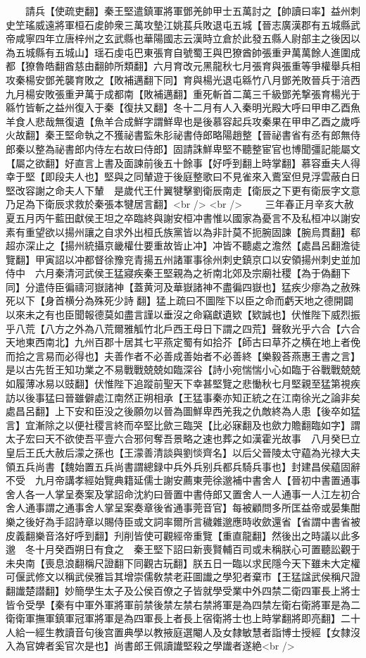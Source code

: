 　　請兵【使疏吏翻】秦王堅遣鎮軍將軍鄧羌帥甲士五萬討之【帥讀曰率】益州刺史笁瑤威遠將軍桓石䖍帥衆三萬攻墊江姚萇兵敗退屯五城【晉志廣漢郡有五城縣武帝咸寧四年立唐梓州之玄武縣也華陽國志云漢時立倉於此發五縣人尉部主之後因以為五城縣有五城山】瑶石虔屯巴東張育自號蜀王與巴獠酋帥張重尹萬萬餘人進圍成都【獠魯皓翻酋慈由翻帥所類翻】六月育改元黑龍秋七月張育與張重等爭權舉兵相攻秦楊安鄧羌襲育敗之【敗補邁翻下同】育與楊光退屯緜竹八月鄧羌敗晉兵于涪西九月楊安敗張重尹萬于成都南【敗補邁翻】重死斬首二萬三千級鄧羌撃張育楊光于緜竹皆斬之益州復入于秦【復扶又翻】冬十二月有人入秦明光殿大呼曰甲申乙酉魚羊食人悲哉無復遺【魚羊合成鮮字謂鮮卑也是後慕容起兵攻秦果在甲申乙酉之歲呼火故翻】秦王堅命執之不獲祕書監朱肜祕書侍郎略陽趙整【晉祕書省有丞有郎無侍郎秦以整為祕書郎内侍左右故曰侍郎】固請誅鮮卑堅不聽整宦官也博聞彊記能屬文【屬之欲翻】好直言上書及面諫前後五十餘事【好呼到翻上時掌翻】慕容垂夫人得幸于堅【即段夫人也】堅與之同輦遊于後庭整歌曰不見雀來入鷰室但見浮雲蔽白日堅改容謝之命夫人下輦　是歲代王什翼犍擊劉衛辰南走【衛辰之下更有衛辰字文意乃足為下衛辰求救於秦張本犍居言翻】<br />
<br />
　　三年春正月辛亥大赦　夏五月丙午藍田獻侯王坦之卒臨終與謝安桓冲書惟以國家為憂言不及私桓冲以謝安素有重望欲以揚州讓之自求外出桓氏族黨皆以為非計莫不扼腕固諫【腕烏貫翻】郗超亦深止之【揚州統攝京畿權仕要重故皆止冲】冲皆不聽處之澹然【處昌呂翻澹徒覽翻】甲寅詔以冲都督徐豫兖青揚五州諸軍事徐州刺史鎮京口以安領揚州刺史並加侍中　六月秦清河武侯王猛寢疾秦王堅親為之祈南北郊及宗廟社稷【為于偽翻下同】分遣侍臣徧禱河嶽諸神【蓋黄河及華嶽諸神不盡徧四嶽也】猛疾少瘳為之赦殊死以下【身首横分為殊死少詩翻】猛上疏曰不圖陛下以臣之命而虧天地之德開闢以來未之有也臣聞報德莫如盡言謹以垂沒之命竊獻遺欵【欵誠也】伏惟陛下威烈振乎八荒【八方之外為八荒爾雅觚竹北戶西王母日下謂之四荒】聲敎光乎六合【六合天地東西南北】九州百郡十居其七平燕定蜀有如拾芥【師古曰草芥之横在地上者俛而拾之言易而必得也】夫善作者不必善成善始者不必善終【樂毅荅燕惠王書之言】是以古先哲王知功業之不易戰戰兢兢如臨深谷【詩小宛惴惴小心如臨于谷戰戰兢兢如履薄冰易以豉翻】伏惟陛下追蹤前聖天下幸甚堅覽之悲慟秋七月堅親至猛第視疾訪以後事猛曰晉雖僻處江南然正朔相承【王猛事秦亦知正統之在江南徐光之論非矣處昌呂翻】上下安和臣没之後願勿以晉為圖鮮卑西羌我之仇敵終為人患【後卒如猛言】宜漸除之以便社稷言終而卒堅比歛三臨哭【比必寐翻及也歛力贍翻臨如字】謂太子宏曰天不欲使吾平壹六合邪何奪吾景略之速也葬之如漢霍光故事　八月癸巳立皇后王氏大赦后濛之孫也【王濛善清談與劉惔齊名】以后父晉陵太守藴為光禄大夫領五兵尚書【魏始置五兵尚書謂總録中兵外兵别兵都兵騎兵事也】封建昌侯藴固辭不受　九月帝講孝經始覽典籍延儒士謝安薦東莞徐邈補中書舍人【晉初中書置通事舍人各一人掌呈奏案及掌詔命沈約曰晉置中書侍郎又置舍人一人通事一人江左初合舍人通事謂之通事舍人掌呈案奏章後省通事莞音官】每被顧問多所匡益帝或晏集酣樂之後好為手詔詩章以賜侍臣或文詞率爾所言穢雜邈應時收歛還省【省謂中書省被皮義翻樂音洛好呼到翻】刋削皆使可觀經帝重覽【重直龍翻】然後出之時議以此多邈　冬十月癸酉朔日有食之　秦王堅下詔曰新喪賢輔百司或未稱朕心可置聽訟觀于未央南【喪息浪翻稱尺證翻下同觀古玩翻】朕五日一臨以求民隱今天下雖未大定權可偃武修文以稱武侯雅旨其增崇儒敎禁老莊圖䜟之學犯者棄市【王猛諡武侯稱尺證翻䜟楚譛翻】妙簡學生太子及公侯百僚之子皆就學受業中外四禁二衛四軍長上將士皆令受學【秦有中軍外軍將軍前禁後禁左禁右禁將軍是為四禁左衛右衛將軍是為二衛衛軍撫軍鎮軍冠軍將軍是為四軍長上者長上宿衛將士也上時掌翻將即亮翻】二十人給一經生教讀音句後宫置典學以教掖庭選閹人及女隸敏慧者詣博士授經【女隸沒入為官婢者奚官次是也】尚書郎王佩讀䜟堅殺之學䜟者遂絶<br />
